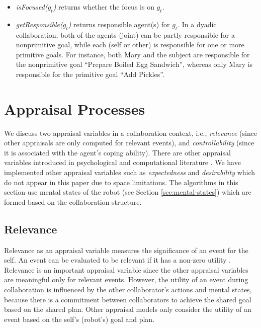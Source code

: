 \documentclass{article}
\begin{document}
\begin{itemize}[leftmargin=2pt]
  \item \textit{isFocused($g_t$)} returns whether the focus is on $g_t$.
  
  \item \textit{getResponsible($g_t$)} returns responsible agent(s) for $g_t$.
  In a dyadic collaboration, both of the agents (joint) can be partly responsible
  for a nonprimitive goal, while each (self or other) is responsible for one or
  more primitive goals. For instance, both Mary and the subject are responsible
  for the nonprimitive goal ``Prepare Boiled Egg Sandwich'', whereas only Mary
  is responsible for the primitive goal ``Add Pickles''.
\end{itemize}

\vspace*{-5mm}
\section{Appraisal Processes}
\label{sec:appraisal-process}

We discuss two appraisal variables in a collaboration context, i.e.,
\textit{relevance} (since other appraisals are only computed for relevant
events), and \textit{controllability} (since it is associated with the agent's
coping ability). There are other appraisal variables introduced in psychological
\cite{scherer:appraisal-processes} and computational literature
\cite{gratch:domain-independent}. We have implemented other appraisal variables
such as \textit{expectedness} \cite{shayganfar:appraisal-short} and
\textit{desirability} \cite{shayganfar:emotional-awareness} which do not appear
in this paper due to space limitations. The algorithms in this section use
mental states of the robot (see Section \ref{sec:mental-states}) which are
formed based on the collaboration structure.

\vspace*{-2mm}
\subsection{Relevance}

Relevance as an appraisal variable measures the significance of an event for the
self. An event can be evaluated to be relevant if it has a non-zero utility
\cite{marsella:ema-process-model}. Relevance is an important appraisal variable
since the other appraisal variables are meaningful only for relevant events.
However, the utility of an event during collaboration is influenced by the other
collaborator's actions and mental states, because there is a commitment between
collaborators to achieve the shared goal based on the shared plan. Other
appraisal models only consider the utility of an event based on the self's
(robot's) goal and plan.
\end{document}
